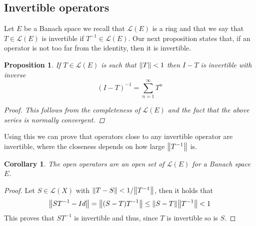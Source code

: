 \documentclass[12pt]{article}
\newtheorem{proposition}{Proposition}
\newtheorem{corollary}{Corollary}
\begin{document}
\subsection{Invertible operators}
Let $E$ be a Banach space we recall that $\mathcal{L}(E)$ is a ring and that we say that $T\in\mathcal{L}(E)$ is invertible if $T^{-1}\in\mathcal{L}(E)$. Our next proposition states that, if an operator is not too far from the identity, then it is invertible.
\begin{proposition}
	If $T\in\mathcal{L}(E)$ is such that $\norm{T}<1$ then $I-T$ is invertible with inverse
	\begin{equation*}
		(I-T)^{-1}=\sum_{n=1}^\infty T^n
	\end{equation*}
	\begin{proof}
		This follows from the completeness of $\mathcal{L}(E)$ and the fact that the above series is normally convergent.
	\end{proof}
\end{proposition}
Using this we can prove that operators close to any invertible operator are invertible, where the closeness depends on how large $\norm{T^{-1}}$ is.
\begin{corollary}
	The open operators are an open set of $\mathcal{L}(E)$ for a Banach space $E$.
\end{corollary}
\begin{proof}
	Let $S\in\mathcal{L}(X)$  with $\norm{T-S}<1/\norm{T^{-1}}$, then it holds that
	\begin{equation*}
		\norm{ST^{-1}-Id}=\norm{(S-T)T^{-1}}\leq\norm{S-T}\norm{T^{-1}}<1
	\end{equation*}
	This proves that $ST^{-1}$ is invertible and thus, since $T$ is invertible so is $S$.
\end{proof}
\end{document}
